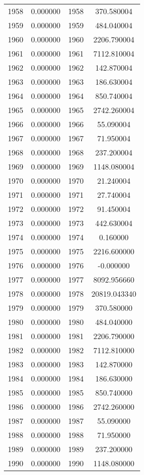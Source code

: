 \documentclass[12pt]{article}
\begin{document}
\begin{longtable}{@{}cccc@{}}
1958 & 0.000000 & 1958 & 370.580004 \\
1959 & 0.000000 & 1959 & 484.040004 \\
1960 & 0.000000 & 1960 & 2206.790004 \\
1961 & 0.000000 & 1961 & 7112.810004 \\
1962 & 0.000000 & 1962 & 142.870004 \\
1963 & 0.000000 & 1963 & 186.630004 \\
1964 & 0.000000 & 1964 & 850.740004 \\
1965 & 0.000000 & 1965 & 2742.260004 \\
1966 & 0.000000 & 1966 & 55.090004 \\
1967 & 0.000000 & 1967 & 71.950004 \\
1968 & 0.000000 & 1968 & 237.200004 \\
1969 & 0.000000 & 1969 & 1148.080004 \\
1970 & 0.000000 & 1970 & 21.240004 \\
1971 & 0.000000 & 1971 & 27.740004 \\
1972 & 0.000000 & 1972 & 91.450004 \\
1973 & 0.000000 & 1973 & 442.630004 \\
1974 & 0.000000 & 1974 & 0.160000 \\
1975 & 0.000000 & 1975 & 2216.600000 \\
1976 & 0.000000 & 1976 & -0.000000 \\
1977 & 0.000000 & 1977 & 8092.956660 \\
1978 & 0.000000 & 1978 & 20819.043340 \\
1979 & 0.000000 & 1979 & 370.580000 \\
1980 & 0.000000 & 1980 & 484.040000 \\
1981 & 0.000000 & 1981 & 2206.790000 \\
1982 & 0.000000 & 1982 & 7112.810000 \\
1983 & 0.000000 & 1983 & 142.870000 \\
1984 & 0.000000 & 1984 & 186.630000 \\
1985 & 0.000000 & 1985 & 850.740000 \\
1986 & 0.000000 & 1986 & 2742.260000 \\
1987 & 0.000000 & 1987 & 55.090000 \\
1988 & 0.000000 & 1988 & 71.950000 \\
1989 & 0.000000 & 1989 & 237.200000 \\
1990 & 0.000000 & 1990 & 1148.080000 \\

\end{longtable}
\end{document}
